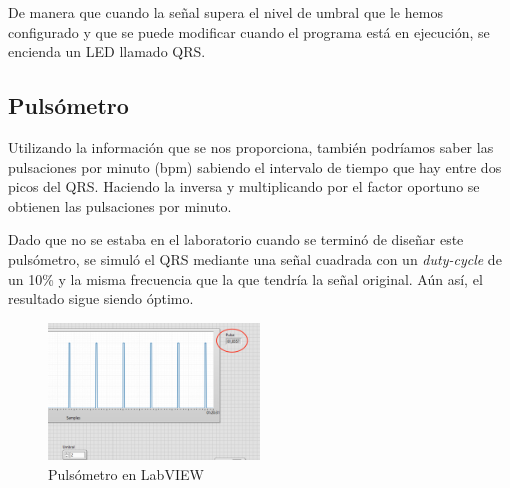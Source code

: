 \documentclass[conference]{IEEEtran}
\begin{document}
De manera que cuando la señal supera el nivel de umbral que le hemos configurado y que se puede modificar cuando el programa está en ejecución, se encienda un LED llamado QRS.

\subsection{Pulsómetro}
Utilizando la información que se nos proporciona, también podríamos saber las pulsaciones por minuto (bpm) sabiendo el intervalo de tiempo que hay entre dos picos del QRS. Haciendo la inversa y multiplicando por el factor oportuno se obtienen las pulsaciones por minuto.

Dado que no se estaba en el laboratorio cuando se terminó de diseñar este pulsómetro, se simuló el QRS mediante una señal cuadrada con un \textit{duty-cycle} de un 10\% y la misma frecuencia que la que tendría la señal original. Aún así, el resultado sigue siendo óptimo.
\begin{figure}[H]
    \centerline{\includegraphics[width=0.5\textwidth]{e_pulsometro.png}}
    \caption{Pulsómetro en LabVIEW}
    \end{figure}
\end{document}
